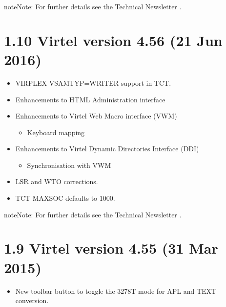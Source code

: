 \documentclass[letterpaper,10pt,english]{sphinxmanual}
\begin{document}
\begin{sphinxadmonition}{note}{Note:}
For further details see the Technical Newsletter .
\end{sphinxadmonition}


\section{1.10 Virtel version 4.56 (21 Jun 2016)}
\label{\detokenize{Installation_Guide:virtel-version-4-56-21-jun-2016}}
\begin{itemize}
\item {} 
VIRPLEX VSAMTYP=WRITER support in TCT.

\item {} 
Enhancements to HTML Administration interface

\item {} 
Enhancements to Virtel Web Macro interface (VWM)
\begin{itemize}
\item {} 
Keyboard mapping

\end{itemize}

\item {} 
Enhancements to Virtel Dynamic Directories Interface (DDI)
\begin{itemize}
\item {} 
Synchronisation with VWM

\end{itemize}

\end{itemize}


\begin{itemize}
\item {} 
LSR and WTO corrections.

\item {} 
TCT MAXSOC defaults to 1000.

\end{itemize}

\begin{sphinxadmonition}{note}{Note:}
For further details see the Technical Newsletter .
\end{sphinxadmonition}


\section{1.9 Virtel version 4.55 (31 Mar 2015)}
\label{\detokenize{Installation_Guide:virtel-version-4-55-31-mar-2015}}
\begin{itemize}
\item {} 
New toolbar button to toggle the 3278T mode for APL and TEXT conversion.

\end{itemize}
\end{document}
